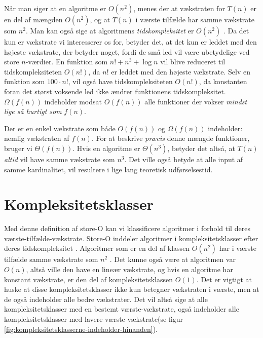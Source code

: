 Når man siger at en algoritme er $O(n^2)$, menes der at vækstraten for $T(n)$ er en del af mængden $O(n^2)$, og at $T(n)$ i værste tilfælde har samme vækstrate som $n^2$. Man kan også sige at algoritmens \emph{tidskompleksitet} er $O(n^2)$ \cite{time-complexity-use}. Da det kun er vækstrate vi interesserer os for, betyder det, at det kun er leddet med den højeste vækstrate, der betyder noget, fordi de små led vil være ubetydelige ved store $n$-værdier. En funktion som $n! + n^3+\log n$ vil blive reduceret til tidskompleksiteten $O(n!)$, da $n!$ er leddet med den højeste vækstrate. Selv en funktion som $100 \cdot n!$, vil også have tidskompleksiteten $O(n!)$, da konstanten foran det størst voksende led ikke ændrer funktionens tidskompleksitet.\\

$\Omega (f(n))$ indeholder modsat $O(f(n))$ alle funktioner der vokser \emph{mindst lige så hurtigt som} $f(n)$.\\ \red{[kilde]}

Der er en enkel vækstrate som både $O(f(n))$ og $\Omega (f(n))$ indeholder: nemlig vækstraten af $f(n)$. For at beskrive \emph{præcis} denne mængde funktioner, bruger vi $\Theta (f(n))$. Hvis en algoritme er $\Theta (n^3)$, betyder det altså, at $T(n)$ \emph{altid} vil have samme vækstrate som $n^3$. Det ville også betyde at alle input af samme kardinalitet, vil resultere i lige lang teoretisk udførselsestid.


\section{Kompleksitetsklasser} 
\label{sec:Kompleksitetsklasser}


Med denne definition af store-O kan vi klassificere algoritmer i forhold til deres værste-tilfælde-vækstrate. Store-O inddeler algoritmer i kompleksitetsklasser efter deres tidskompleksitet \cite{time-complexity}. Algoritmer som er en del af klassen $O(n^2)$ har i værste tilfælde samme vækstrate som $n^2$ . Det kunne også være at algoritmen var $O(n)$, altså ville den have en lineær vækstrate, og hvis en algoritme har konstant vækstrate, er den del af kompleksitetsklassen $O(1)$. Det er vigtigt at huske at disse kompleksitetsklasser ikke kun betegner vækstraten i værste, men at de også indeholder alle bedre vækstrater. Det vil altså sige at alle kompleksitetsklasser med en bestemt værste-vækstrate, også indeholder alle kompleksitetsklasser med lavere værste-vækstrate(se figur \ref{fig:kompleksitetsklasserne-indeholder-hinanden}).

